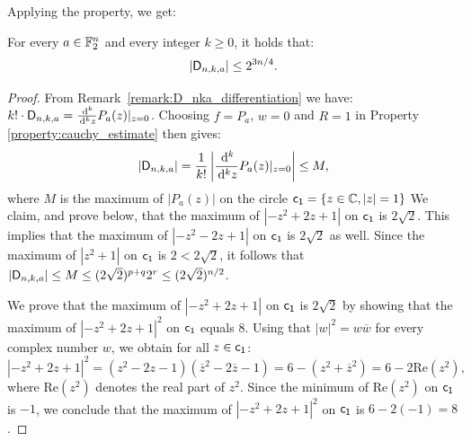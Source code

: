 \documentclass[11pt]{llncs}
\begin{document}




Applying the property, we get:

\begin{theorem}\label{theorem:bound_D_nka}
    For every $a\in\mathbb{F}_2^n$ and every integer $k\geq 0$, it holds that:
    \[
        |\mathsf{D}_{n,k,a}|\leq 2^{3n/4}.
    \]
\end{theorem}

\begin{proof}
    From Remark~\ref{remark:D_nka_differentiation} we have: $k!\cdot\mathsf{D}_{n,k,a}=\frac{\,\mathrm d^k}{\,\mathrm d^k z}P_a(z)\vert_{z=0}$. Choosing $f=P_a$, $w=0$ and $R=1$ in Property \ref{property:cauchy_estimate} then gives:
    \[
        |\mathsf{D}_{n,k,a}|=\frac{1}{k!}\left|\frac{\,\mathrm d^k}{\,\mathrm d^k z}P_a(z)\vert_{z=0}\right|\leq M,
    \]
    where $M$ is the maximum of $|P_a(z)|$ on the circle %
    $\mathsf{c_1}=\{ z \in \mathbb{C},  |z|=1  \}$
    We claim, and prove below, that the maximum of $\left|-z^2+2z+1\right|$ on $\mathsf{c_1}$ is $2\sqrt 2$. 
    This implies that the maximum of $\left|-z^2-2z+1\right|$ on $\mathsf{c_1}$ is $2\sqrt 2$ as well. 
    Since the maximum of $\left|z^2+1\right|$ on $\mathsf{c_1}$ is $2<2\sqrt 2$, it follows that $|\mathsf{D}_{n,k,a}|\leq M\leq (2\sqrt 2)^{p+q}2^r\leq (2\sqrt 2)^{n/2}$.

	We prove that the maximum of $\left|-z^2+2z+1\right|$ on $\mathsf{c_1}$ is $2\sqrt 2$ by showing that the maximum of $\left|-z^2+2z+1\right|^2$ on $\mathsf{c_1}$ equals $8$.
    Using that $|w|^2=w\overline w$ for every complex number $w$, we obtain for all $z\in \mathsf{c_1}$:
    \[
        \left|-z^2+2z+1\right|^2=\left(z^2-2z-1\right)\left(\overline z^2-2\overline z-1\right)=6-\left(z^2+\overline z^2\right)=6-2\mathrm{Re}\left(z^2\right),
    \]
    where $\mathrm{Re}\left(z^2\right)$ denotes the real part of $z^2$. Since the minimum of $\mathrm{Re}\left(z^2\right)$ on $\mathsf{c_1}$ is $-1$, we conclude that the maximum of $\left|-z^2+2z+1\right|^2$ on $\mathsf{c_1}$ is $6-2(-1)=8$. 
     
    
\end{proof}
\end{document}
